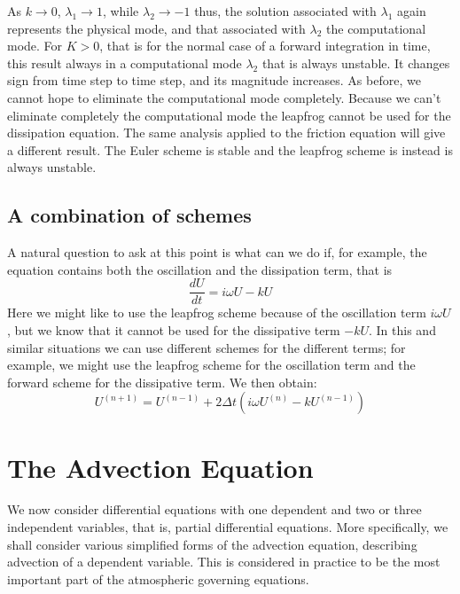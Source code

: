 As $k\rightarrow0$, $\lambda_1\rightarrow1$, while $\lambda_2\rightarrow-1$ thus, the solution associated with $\lambda_1$ again represents the physical mode, and that associated with $\lambda_2$ the computational mode. For  $K>0$, that is for the normal case of a forward integration in time,  this  result  always  in  a  computational  mode $\lambda_2$  that  is always  unstable. It changes sign from time step to time step, and its magnitude increases. As before, we cannot hope to eliminate the computational mode completely. Because  we  can’t  eliminate  completely  the computational   mode   the   leapfrog   cannot   be   used   for   the dissipation equation.
The  same  analysis  applied  to  the  friction  equation  will  give  a different  result.  The  Euler  scheme  is  stable  and  the  leapfrog scheme is instead is always unstable.
\subsection{A combination of schemes}
A natural question to ask at this point is what can we do if, for example, the equation contains both the oscillation and the dissipation term, that is
\begin{equation}\label{3.4.1}
	\frac{dU}{dt}=i\omega U-kU
\end{equation}
Here we might like to use the leapfrog scheme because of the oscillation term $i\omega U$, but we know that it cannot be used for the dissipative term $-kU$. In this and similar situations we can use different schemes for the different terms; for example, we might use the leapfrog scheme for the oscillation term and the forward scheme for the dissipative term. We then obtain:
\begin{equation}
	U^{(n+1)}=U^{(n-1)}+2\Delta t\left(i\omega U^{(n)}-kU^{(n-1)}\right)
\end{equation}
\section{The Advection Equation}
We now consider differential equations with one dependent and two or three independent variables, that is, partial differential equations. More specifically, we shall consider various simplified forms of the advection equation, describing advection of a dependent variable. This is considered in practice to be the most important part of the atmospheric governing equations.

